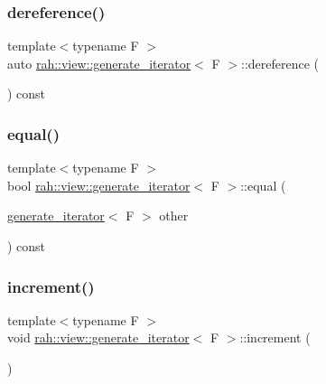 \subsubsection{\texorpdfstring{dereference()}{dereference()}}
{\footnotesize\ttfamily template$<$typename F $>$ \\
auto \mbox{\hyperlink{structrah_1_1view_1_1generate__iterator}{rah\+::view\+::generate\+\_\+iterator}}$<$ F $>$\+::dereference (\begin{DoxyParamCaption}{ }\end{DoxyParamCaption}) const\hspace{0.3cm}{\ttfamily [inline]}}

\mbox{\label{structrah_1_1view_1_1generate__iterator_a8cd374b2e2f6f9e9d3fc841140000f57}} 
\subsubsection{\texorpdfstring{equal()}{equal()}}
{\footnotesize\ttfamily template$<$typename F $>$ \\
bool \mbox{\hyperlink{structrah_1_1view_1_1generate__iterator}{rah\+::view\+::generate\+\_\+iterator}}$<$ F $>$\+::equal (\begin{DoxyParamCaption}\item[{\mbox{\hyperlink{structrah_1_1view_1_1generate__iterator}{generate\+\_\+iterator}}$<$ F $>$}]{other }\end{DoxyParamCaption}) const\hspace{0.3cm}{\ttfamily [inline]}}

\mbox{\label{structrah_1_1view_1_1generate__iterator_aeb0fc0db74bda811fe5d7cb8c6efe1e0}} 
\subsubsection{\texorpdfstring{increment()}{increment()}}
{\footnotesize\ttfamily template$<$typename F $>$ \\
void \mbox{\hyperlink{structrah_1_1view_1_1generate__iterator}{rah\+::view\+::generate\+\_\+iterator}}$<$ F $>$\+::increment (\begin{DoxyParamCaption}{ }\end{DoxyParamCaption})\hspace{0.3cm}{\ttfamily [inline]}}



